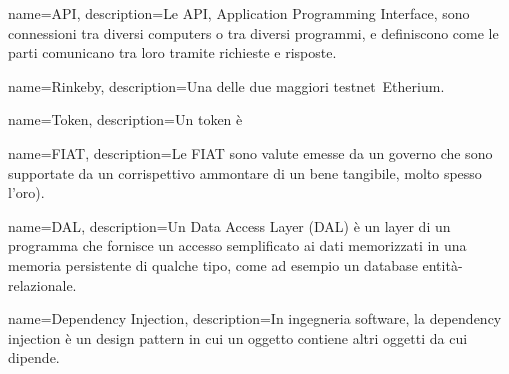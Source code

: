 {
  name={API},
  description={Le API, Application Programming Interface, sono connessioni tra diversi computers o tra diversi programmi, e definiscono come le parti comunicano tra loro tramite richieste e risposte.}
}

{
  name={Rinkeby},
  description={Una delle due maggiori testnet\glo\ Etherium.}
}

{
  name={Token},
  description={Un token è }
}

{
  name={FIAT},
  description={Le FIAT sono valute emesse da un governo che sono supportate da un corrispettivo ammontare di un bene tangibile, molto spesso l'oro).}
}

{
  name={DAL},
  description={Un Data Access Layer (DAL) è un layer di un programma che fornisce un accesso semplificato ai dati memorizzati in una memoria persistente di qualche tipo, come ad esempio un database entità-relazionale.}
}

{
  name={Dependency Injection},
  description={In ingegneria software, la dependency injection è un design pattern in cui un oggetto contiene altri oggetti da cui dipende.}
}